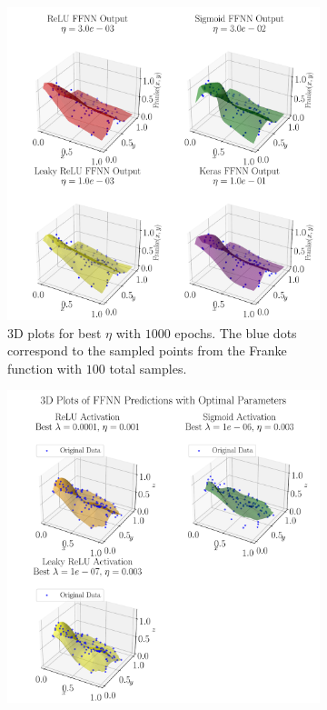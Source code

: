 \documentclass[%
reprint,
amsmath,amssymb,
aps,
]{revtex4-2}
\begin{document}
\begin{figure}[ht!]
\begin{subfigure}[b]{0.49\textwidth}
	\includegraphics[width=\textwidth]{Python/Figures/NN_3D_Predict_Franke_Epochs1000.pdf}
	\caption{3D plots for best $\eta$ with $1000$ epochs. The blue dots correspond to the sampled points from the Franke function with $100$ total samples.}
	\label{fig:3D_Franke}
\end{subfigure}
\hfill
\begin{subfigure}[b]{0.49\textwidth}
	\includegraphics[width=\textwidth]{Python/Figures/NN_noKeras_3D_Franke_Epochs250.pdf}

\end{subfigure}
\end{figure}
\end{document}
